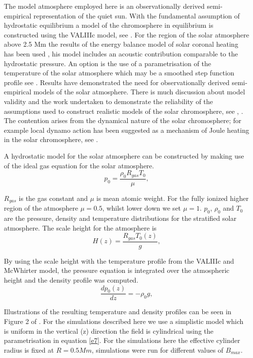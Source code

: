 \documentclass[twocolumn]{aastex62}
\begin{document}
The model atmosphere employed here is an observationally derived semi-empirical representation of the quiet sun. With the fundamental assumption of hydrostatic equilibrium a model of the chromosphere in equilibrium is constructed using the VALIIIc model, see \citet{Vernazza1981}. For the region of the solar atmosphere above 2.5 Mm the results of the energy balance model of solar coronal heating has been used \citep[see][]{McWhirter1975}, his model includes an acoustic contribution comparable to the hydrostatic pressure. An option is the use of a parametrisation of the temperature of the solar atmosphere which may be a smoothed step function profile see \citet{Murawski2010}. Results have demonstrated the need for observationally derived semi-empirical models of the solar atmosphere. There is much discussion about model validity and the work undertaken to 
demonstrate the reliability of the assumptions used to construct realistic models of the solar chromosphere, see \citet{Carlsson1995}, \citet{Kalkofen2012}. The contention arises from the dynamical nature of the solar chromosphere; for example local dynamo action has been suggested as a mechanism of Joule heating in the solar chromosphere, see \citet{Leenaarts2011}.  

A hydrostatic model for the solar atmosphere can be constructed by making use of the ideal gas equation for the solar atmosphere.
\begin{equation}
p_{0}=\frac{\rho_{0}R_{gas}T_{0}}{\mu}  , \label{e8}
\end{equation}

$R_{gas}$ is the gas constant and $\mu$ is mean atomic weight. For the fully ionized higher region of the atmosphere $\mu=0.5$, whilst lower down we set $\mu=1$. $p_{0}$, $\rho_{0}$ and $T_{0}$ are the pressure, density and temperature distributions for the stratified solar atmosphere. The scale height for the atmosphere is
\begin{equation}
H(z)=\frac{R_{gas}T_{0}(z)}{g}  , \label{e10}
\end{equation}

By using the scale height with the temperature profile from the VALIIIc and McWhirter model, the pressure equation is integrated over the atmospheric height and the density profile was computed.
\begin{equation}
\frac{dp_{0}(z)}{dz}=-\rho_{0}g   , \label{e9}
\end{equation}

Illustrations of the resulting temperature and density profiles can be seen in Figure 2 of \citet{Griffiths2018}. For the simulations described here we use a simplistic model which is uniform in the vertical (z) direction the field is cylindrical using the parametrisation in equation \ref{e7}. For the simulations here the effective cylinder radius is fixed at $R=0.5Mm$, simulations were run for different values of $B_{max}$.
\end{document}
